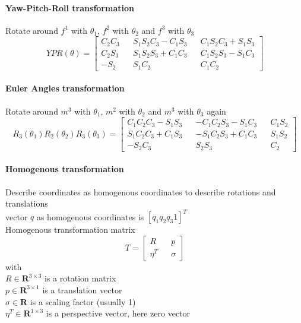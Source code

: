\documentclass{article}
\begin{document}
	\paragraph{Yaw-Pitch-Roll transformation} Rotate around $f^1$ with $\theta_{1}$, $f^2$ with $\theta_{2}$ and $f^3$ with $\theta_{3}$
	\begin{equation}
	YPR(\theta) = 
	\begin{bmatrix}
	C_{2} C_{3} && S_{1} S_{2} C_{3} - C_{1} S_{3} && C_{1} S_{2} C_{3} + S_{1} S_{3}\\
	C_{2} S_{3}  && S_{1} S_{2} S_{3} + C_{1} C_{3} && C_{1} S_{2} S_{3} - S_{1} C_{3}\\
	-S_{2} && S_{1} C_{2} && C_{1} C_{2}
	\end{bmatrix}
	\end{equation}
	
	\paragraph{Euler Angles transformation} Rotate around $m^3$ with $\theta_{1}$, $m^2$ with $\theta_{2}$ and $m^3$ with $\theta_{3}$ again
	\begin{equation}
	R_{3}(\theta_{1}) R_{2}(\theta_{2}) R_{3}(\theta_{3}) = 
	\begin{bmatrix}
	C_{1} C_{2} C_{3} - S_{1} S_{3} && -C_{1} C_{2} S_{3} - S_{1} C_{3} && C_{1} S_{2}\\
	S_{1} C_{2} C_{3} + C_{1} S_{3}  && -S_{1} C_{2} S_{3} + C_{1} C_{3} && S_{1} S_{2}\\
	-S_{2} C_{3} && S_{2} S_{3} && C_{2}
	\end{bmatrix}
	\end{equation}
		
	\paragraph{Homogenous transformation} Describe coordinates as homogenous coordinates to describe rotations and translations\\
	vector $q$ as homogenous coordinates is $[q_{1} q_{2} q_{3} 1]^T$\\
	Homogenous transformation matrix
	\begin{equation}
	T = 
	\begin{bmatrix}
	R && p\\
	\eta^T && \sigma
	\end{bmatrix}
	\end{equation}
	with\\
	$R \in \mathbf{R}^{3 \times 3}$ is a rotation matrix\\
	$p \in \mathbf{R}^{3 \times 1}$ is a translation vector\\
	$\sigma \in \mathbf{R}$ is a scaling factor (usually 1)\\
	$\eta^T \in \mathbf{R}^{1 \times 3}$ is a perspective vector, here zero vector
	
\end{document}
